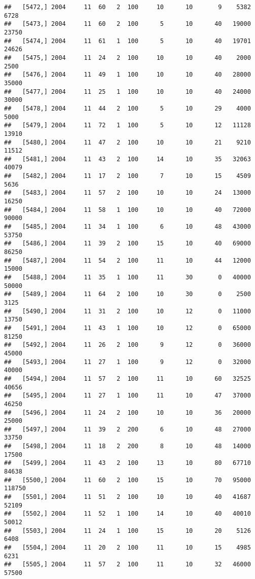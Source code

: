 \documentclass{article}\usepackage[]{graphicx}\usepackage[]{color}
\makeatletter
\newenvironment{kframe}{%
 \def\at@end@of@kframe{}%
 \ifinner\ifhmode%
  \def\at@end@of@kframe{\end{minipage}}%
  \begin{minipage}{\columnwidth}%
 \fi\fi%
 \def\FrameCommand##1{\hskip\@totalleftmargin \hskip-\fboxsep
 \colorbox{shadecolor}{##1}\hskip-\fboxsep
     \hskip-\linewidth \hskip-\@totalleftmargin \hskip\columnwidth}%
 \MakeFramed {\advance\hsize-\width
   \@totalleftmargin\z@ \linewidth\hsize
   \@setminipage}}%
 {\par\unskip\endMakeFramed%
 \at@end@of@kframe}
\newenvironment{knitrout}{}{} %
\makeatother
\begin{document}
\begin{knitrout}
\begin{kframe}
\begin{verbatim}
##   [5472,] 2004     11  60   2  100     10      10       9    5382    6728
##   [5473,] 2004     11  60   2  100      5      10      40   19000   23750
##   [5474,] 2004     11  61   1  100      5      10      40   19701   24626
##   [5475,] 2004     11  24   2  100     10      10      40    2000    2500
##   [5476,] 2004     11  49   1  100     10      10      40   28000   35000
##   [5477,] 2004     11  25   1  100     10      10      40   24000   30000
##   [5478,] 2004     11  44   2  100      5      10      29    4000    5000
##   [5479,] 2004     11  72   1  100      5      10      12   11128   13910
##   [5480,] 2004     11  47   2  100     10      10      21    9210   11512
##   [5481,] 2004     11  43   2  100     14      10      35   32063   40079
##   [5482,] 2004     11  17   2  100      7      10      15    4509    5636
##   [5483,] 2004     11  57   2  100     10      10      24   13000   16250
##   [5484,] 2004     11  58   1  100     10      10      40   72000   90000
##   [5485,] 2004     11  34   1  100      6      10      48   43000   53750
##   [5486,] 2004     11  39   2  100     15      10      40   69000   86250
##   [5487,] 2004     11  54   2  100     11      10      44   12000   15000
##   [5488,] 2004     11  35   1  100     11      30       0   40000   50000
##   [5489,] 2004     11  64   2  100     10      30       0    2500    3125
##   [5490,] 2004     11  31   2  100     10      12       0   11000   13750
##   [5491,] 2004     11  43   1  100     10      12       0   65000   81250
##   [5492,] 2004     11  26   2  100      9      12       0   36000   45000
##   [5493,] 2004     11  27   1  100      9      12       0   32000   40000
##   [5494,] 2004     11  57   2  100     11      10      60   32525   40656
##   [5495,] 2004     11  27   1  100     11      10      47   37000   46250
##   [5496,] 2004     11  24   2  100     10      10      36   20000   25000
##   [5497,] 2004     11  39   2  200      6      10      48   27000   33750
##   [5498,] 2004     11  18   2  200      8      10      48   14000   17500
##   [5499,] 2004     11  43   2  100     13      10      80   67710   84638
##   [5500,] 2004     11  60   2  100     15      10      70   95000  118750
##   [5501,] 2004     11  51   2  100     10      10      40   41687   52109
##   [5502,] 2004     11  52   1  100     14      10      40   40010   50012
##   [5503,] 2004     11  24   1  100     15      10      20    5126    6408
##   [5504,] 2004     11  20   2  100     11      10      15    4985    6231
##   [5505,] 2004     11  57   2  100     11      10      32   46000   57500

\end{verbatim}
\end{kframe}
\end{knitrout}
\end{document}
